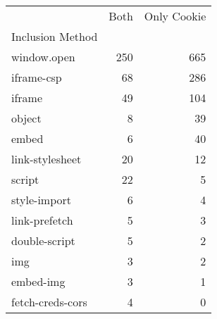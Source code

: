 \begin{tabular}{lrr}
 & Both & Only Cookie \\
Inclusion Method &  &  \\
window.open & 250 & 665 \\
iframe-csp & 68 & 286 \\
iframe & 49 & 104 \\
object & 8 & 39 \\
embed & 6 & 40 \\
link-stylesheet & 20 & 12 \\
script & 22 & 5 \\
style-import & 6 & 4 \\
link-prefetch & 5 & 3 \\
double-script & 5 & 2 \\
img & 3 & 2 \\
embed-img & 3 & 1 \\
fetch-creds-cors & 4 & 0 \\
\end{tabular}
